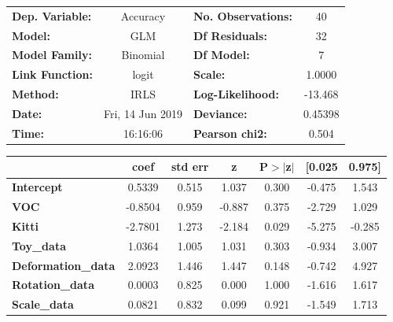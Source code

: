 \begin{figure}[!htb]
	\centering
	\begin{center}
		\begin{tabular}{lclc}
			\toprule
			\textbf{Dep. Variable:}    &     Accuracy     & \textbf{  No. Observations:  } &       40    \\
			\textbf{Model:}            &       GLM        & \textbf{  Df Residuals:      } &       32    \\
			\textbf{Model Family:}     &     Binomial     & \textbf{  Df Model:          } &        7    \\
			\textbf{Link Function:}    &      logit       & \textbf{  Scale:             } &    1.0000   \\
			\textbf{Method:}           &       IRLS       & \textbf{  Log-Likelihood:    } &   -13.468   \\
			\textbf{Date:}             & Fri, 14 Jun 2019 & \textbf{  Deviance:          } &   0.45398   \\
			\textbf{Time:}             &     16:16:06     & \textbf{  Pearson chi2:      } &    0.504    \\
			\bottomrule
		\end{tabular}
		\begin{tabular}{lcccccc}
			& \textbf{coef} & \textbf{std err} & \textbf{z} & \textbf{P$>$$|$z$|$} & \textbf{[0.025} & \textbf{0.975]}  \\
			\midrule
			\textbf{Intercept}         &       0.5339  &        0.515     &     1.037  &         0.300        &       -0.475    &        1.543     \\
			\textbf{VOC}               &      -0.8504  &        0.959     &    -0.887  &         0.375        &       -2.729    &        1.029     \\
			\textbf{Kitti}             &      -2.7801  &        1.273     &    -2.184  &         0.029        &       -5.275    &       -0.285     \\
			\textbf{Toy\_data}         &       1.0364  &        1.005     &     1.031  &         0.303        &       -0.934    &        3.007     \\
			\textbf{Deformation\_data} &       2.0923  &        1.446     &     1.447  &         0.148        &       -0.742    &        4.927     \\
			\textbf{Rotation\_data}    &       0.0003  &        0.825     &     0.000  &         1.000        &       -1.616    &        1.617     \\
			\textbf{Scale\_data}       &       0.0821  &        0.832     &     0.099  &         0.921        &       -1.549    &        1.713     \\

\end{tabular}
\end{center}
\end{figure}
